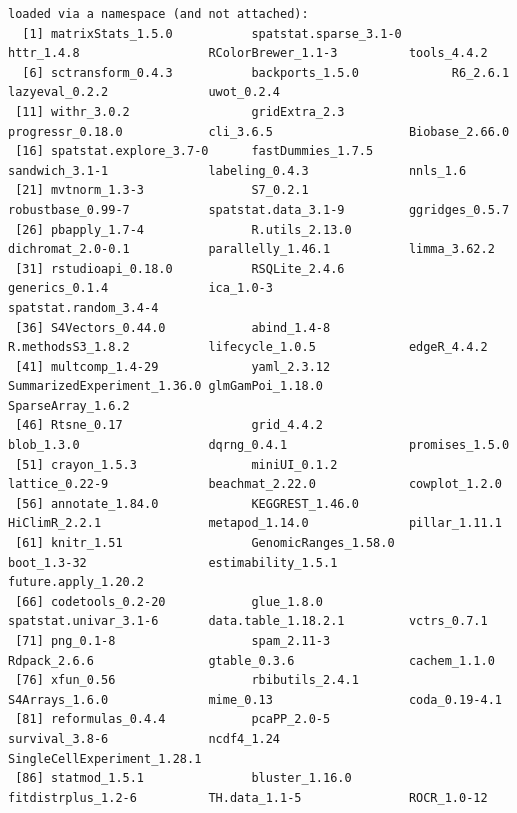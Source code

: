 \documentclass[
  landscape]{article}
\begin{document}
\begin{verbatim}
loaded via a namespace (and not attached):
  [1] matrixStats_1.5.0           spatstat.sparse_3.1-0       httr_1.4.8                  RColorBrewer_1.1-3          tools_4.4.2                
  [6] sctransform_0.4.3           backports_1.5.0             R6_2.6.1                    lazyeval_0.2.2              uwot_0.2.4                 
 [11] withr_3.0.2                 gridExtra_2.3               progressr_0.18.0            cli_3.6.5                   Biobase_2.66.0             
 [16] spatstat.explore_3.7-0      fastDummies_1.7.5           sandwich_3.1-1              labeling_0.4.3              nnls_1.6                   
 [21] mvtnorm_1.3-3               S7_0.2.1                    robustbase_0.99-7           spatstat.data_3.1-9         ggridges_0.5.7             
 [26] pbapply_1.7-4               R.utils_2.13.0              dichromat_2.0-0.1           parallelly_1.46.1           limma_3.62.2               
 [31] rstudioapi_0.18.0           RSQLite_2.4.6               generics_0.1.4              ica_1.0-3                   spatstat.random_3.4-4      
 [36] S4Vectors_0.44.0            abind_1.4-8                 R.methodsS3_1.8.2           lifecycle_1.0.5             edgeR_4.4.2                
 [41] multcomp_1.4-29             yaml_2.3.12                 SummarizedExperiment_1.36.0 glmGamPoi_1.18.0            SparseArray_1.6.2          
 [46] Rtsne_0.17                  grid_4.4.2                  blob_1.3.0                  dqrng_0.4.1                 promises_1.5.0             
 [51] crayon_1.5.3                miniUI_0.1.2                lattice_0.22-9              beachmat_2.22.0             cowplot_1.2.0              
 [56] annotate_1.84.0             KEGGREST_1.46.0             HiClimR_2.2.1               metapod_1.14.0              pillar_1.11.1              
 [61] knitr_1.51                  GenomicRanges_1.58.0        boot_1.3-32                 estimability_1.5.1          future.apply_1.20.2        
 [66] codetools_0.2-20            glue_1.8.0                  spatstat.univar_3.1-6       data.table_1.18.2.1         vctrs_0.7.1                
 [71] png_0.1-8                   spam_2.11-3                 Rdpack_2.6.6                gtable_0.3.6                cachem_1.1.0               
 [76] xfun_0.56                   rbibutils_2.4.1             S4Arrays_1.6.0              mime_0.13                   coda_0.19-4.1              
 [81] reformulas_0.4.4            pcaPP_2.0-5                 survival_3.8-6              ncdf4_1.24                  SingleCellExperiment_1.28.1
 [86] statmod_1.5.1               bluster_1.16.0              fitdistrplus_1.2-6          TH.data_1.1-5               ROCR_1.0-12                

\end{verbatim}
\end{document}
